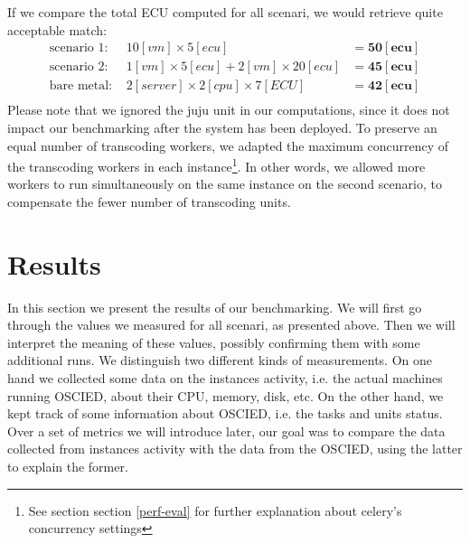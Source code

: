 \documentclass[a4paper, titlepage]{paper}
\numberwithin{figure}{section}
\numberwithin{table}{section}
\begin{document}
      If we compare the total ECU computed for all scenari, we would retrieve quite acceptable match:
      \begin{align*}
        \text{scenario 1: } & 10 [vm] \times 5 [ecu] &= \mathbf{50 [ecu]} \\
        \text{scenario 2: } & 1 [vm] \times 5 [ecu] + 2 [vm] \times 20 [ecu] &= \mathbf{45 [ecu]} \\
        \text{bare metal: } & 2 [server] \times 2 [cpu] \times 7 [ECU] &= \mathbf{42 [ecu]} \\
      \end{align*}
      Please note that we ignored the juju unit in our computations, since it does not impact our benchmarking after the system has been deployed. To preserve an equal number of transcoding workers, we adapted the maximum concurrency of the transcoding workers in each instance\footnote{See section section \ref{perf-eval} for further explanation about celery's concurrency settings}. In other words, we allowed more workers to run simultaneously on the same instance on the second scenario, to compensate the fewer number of transcoding units.

  \section{Results}
    In this section we present the results of our benchmarking. We will first go through the values we measured for all scenari, as presented above. Then we will interpret the meaning of these values, possibly confirming them with some additional runs. We distinguish two different kinds of measurements. On one hand we collected some data on the instances activity, i.e. the actual machines running OSCIED, about their CPU, memory, disk, etc. On the other hand, we kept track of some information about OSCIED, i.e. the tasks and units status. Over a set of metrics we will introduce later, our goal was to compare the data collected from instances activity with the data from the OSCIED, using the latter to explain the former.
\end{document}

